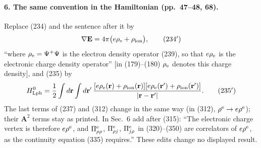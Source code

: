 \paragraph{6. The same convention in the Hamiltonian (pp.~47--48, 68).}
Replace (234) and the sentence after it by
\begin{equation*}
\nabla\mathbf E=4\pi\big(e\rho_{\rm e}+\rho_{\rm ion}\big),
\tag{234$'$}
\end{equation*}
``where $\rho_{\rm e}=\Psi^+\Psi$ is the electron density operator (239), so that $e\rho_{\rm e}$ is the
electronic charge density operator'' [in (179)--(180) $\rho_{\rm e}$ denotes this charge density], and
(235) by
\begin{equation*}
H^0_{\rm Lph}=\frac12\int d\mathbf r\int d\mathbf r'\,
\frac{[e\rho_{\rm e}(\mathbf r)+\rho_{\rm ion}(\mathbf r)][e\rho_{\rm e}(\mathbf r')+\rho_{\rm ion}(\mathbf r')]}{|\mathbf r-\mathbf r'|} .
\tag{235$'$}
\end{equation*}
The last terms of (237) and (312) change in the same way (in (312), $\rho^{\rm e}\to e\rho^{\rm e}$); their
$\mathbf A^2$ terms stay as printed. In Sec.~6 add after (315): ``The electronic charge vertex is
therefore $e\rho^{\rm e}$, and $\Pi^{\rm e}_{\rho\rho}$, $\Pi^{\rm e}_{\rho j}$, $\Pi^{\rm e}_{j\rho}$
in (320)--(350) are correlators of $e\rho^{\rm e}$, as the continuity equation (335) requires.'' These
edits change no displayed result.

